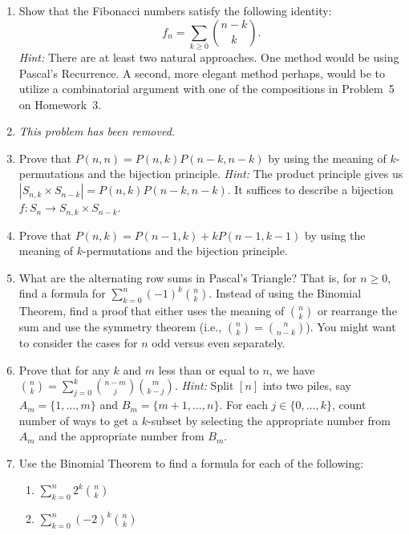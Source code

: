\documentclass[11pt]{article}%
\theoremstyle{definition}
\begin{document}
\begin{enumerate}
\item Show that the Fibonacci numbers satisfy the following identity:
\[
f_n = \sum_{k\geq 0} \binom{n-k}{k}.
\]
\emph{Hint:} There are at least two natural approaches.  One method would be using Pascal's Recurrence.  A second, more elegant method perhaps, would be to utilize a combinatorial argument with one of the compositions in Problem~5 on Homework~3.
\item  \emph{This problem has been removed.}%
\item Prove that $P(n,n) = P(n,k)P(n-k,n-k)$ by using the meaning of $k$-permutations and the bijection principle. \emph{Hint:} The product principle gives us $|S_{n,k}\times S_{n-k}|=P(n,k)P(n-k,n-k)$. It suffices to describe a bijection
$f: S_n \to S_{n,k} \times S_{n-k}$.
\item Prove that $P(n,k)=P(n-1,k)+kP(n-1,k-1)$ by using the meaning of $k$-permutations and the bijection principle.
\item What are the alternating row sums in Pascal's Triangle?  That is, for $n\geq 0$, find a formula for $\sum_{k=0}^{n}(-1)^k\binom{n}{k}$. Instead of using the Binomial Theorem, find a proof that either uses the meaning of $\binom{n}{k}$ or rearrange the sum and use the symmetry theorem (i.e., $\binom{n}{k}=\binom{n}{n-k}$). You might want to consider the cases for $n$ odd versus even separately.
\item Prove that for any $k$ and $m$ less than or equal to $n$, we have $\binom{n}{k}=\sum_{j=0}^k\binom{n-m}{j}\binom{m}{k-j}$. \textit{Hint:} Split $[n]$ into two piles, say $A_m=\{1,\ldots,m\}$ and $B_m=\{m+1,\ldots,n\}$. For each $j\in\{0,\ldots, k\}$, count number of ways to get a $k$-subset by selecting the appropriate number from $A_m$ and the appropriate number from $B_m$.
\item Use the Binomial Theorem to find a formula for each of the following:
\begin{enumerate}
\item $\displaystyle \sum_{k=0}^n2^k\binom{n}{k}$
\item $\displaystyle \sum_{k=0}^n(-2)^k\binom{n}{k}$
\end{enumerate}
\end{enumerate}
\end{document}
